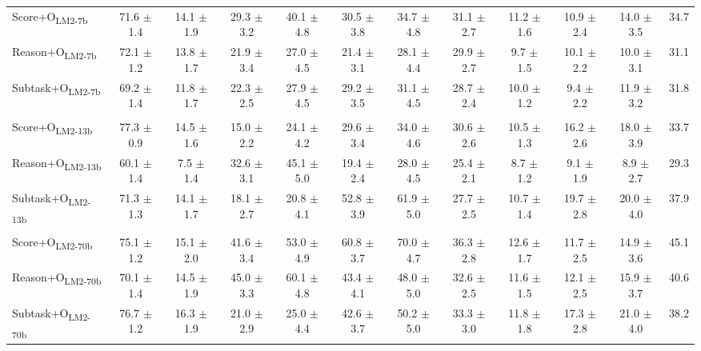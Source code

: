 \documentclass[11pt]{article}
\begin{document}
\begin{table}
\begin{tabular}{l cc | cc | cc | cc | cc | C{1cm}}
\\ 
Score+O\textsubscript{\scriptsize{LM2-7b}}    &  71.6 $\pm$ 1.4  &  14.1 $\pm$ 1.9  &  29.3 $\pm$ 3.2  &  40.1 $\pm$ 4.8  &  30.5 $\pm$ 3.8  &  34.7 $\pm$ 4.8  &  31.1 $\pm$ 2.7  &  11.2 $\pm$ 1.6  &  10.9 $\pm$ 2.4  &  14.0 $\pm$ 3.5  &  34.7 \\ 
Reason+O\textsubscript{\scriptsize{LM2-7b}}    &  72.1 $\pm$ 1.2  &  13.8 $\pm$ 1.7  &  21.9 $\pm$ 3.4  &  27.0 $\pm$ 4.5  &  21.4 $\pm$ 3.1  &  28.1 $\pm$ 4.4  &  29.9 $\pm$ 2.7  &  9.7 $\pm$ 1.5  &  10.1 $\pm$ 2.2  &  10.0 $\pm$ 3.1  &  31.1 \\ 
Subtask+O\textsubscript{\scriptsize{LM2-7b}}    &  69.2 $\pm$ 1.4  &  11.8 $\pm$ 1.7  &  22.3 $\pm$ 2.5  &  27.9 $\pm$ 4.5  &  29.2 $\pm$ 3.5  &  31.1 $\pm$ 4.5  &  28.7 $\pm$ 2.4  &  10.0 $\pm$ 1.2  &  9.4 $\pm$ 2.2  &  11.9 $\pm$ 3.2  &  31.8 \\ 
\\ 
Score+O\textsubscript{\scriptsize{LM2-13b}}    &  77.3 $\pm$ 0.9  &  14.5 $\pm$ 1.6  &  15.0 $\pm$ 2.2  &  24.1 $\pm$ 4.2  &  29.6 $\pm$ 3.4  &  34.0 $\pm$ 4.6  &  30.6 $\pm$ 2.6  &  10.5 $\pm$ 1.3  &  16.2 $\pm$ 2.6  &  18.0 $\pm$ 3.9  &  33.7 \\ 
Reason+O\textsubscript{\scriptsize{LM2-13b}}    &  60.1 $\pm$ 1.4  &  7.5 $\pm$ 1.4  &  32.6 $\pm$ 3.1  &  45.1 $\pm$ 5.0  &  19.4 $\pm$ 2.4  &  28.0 $\pm$ 4.5  &  25.4 $\pm$ 2.1  &  8.7 $\pm$ 1.2  &  9.1 $\pm$ 1.9  &  8.9 $\pm$ 2.7  &  29.3 \\ 
Subtask+O\textsubscript{\scriptsize{LM2-13b}}    &  71.3 $\pm$ 1.3  &  14.1 $\pm$ 1.7  &  18.1 $\pm$ 2.7  &  20.8 $\pm$ 4.1  &  52.8 $\pm$ 3.9  &  61.9 $\pm$ 5.0  &  27.7 $\pm$ 2.5  &  10.7 $\pm$ 1.4  &  19.7 $\pm$ 2.8  &  20.0 $\pm$ 4.0  &  37.9 \\ 
\\ 
Score+O\textsubscript{\scriptsize{LM2-70b}}    &  75.1 $\pm$ 1.2  &  15.1 $\pm$ 2.0  &  41.6 $\pm$ 3.4  &  53.0 $\pm$ 4.9  &  60.8 $\pm$ 3.7  &  70.0 $\pm$ 4.7  &  36.3 $\pm$ 2.8  &  12.6 $\pm$ 1.7  &  11.7 $\pm$ 2.5  &  14.9 $\pm$ 3.6  &  45.1 \\ 
Reason+O\textsubscript{\scriptsize{LM2-70b}}    &  70.1 $\pm$ 1.4  &  14.5 $\pm$ 1.9  &  45.0 $\pm$ 3.3  &  60.1 $\pm$ 4.8  &  43.4 $\pm$ 4.1  &  48.0 $\pm$ 5.0  &  32.6 $\pm$ 2.5  &  11.6 $\pm$ 1.5  &  12.1 $\pm$ 2.5  &  15.9 $\pm$ 3.7  &  40.6 \\ 
Subtask+O\textsubscript{\scriptsize{LM2-70b}}    &  76.7 $\pm$ 1.2  &  16.3 $\pm$ 1.9  &  21.0 $\pm$ 2.9  &  25.0 $\pm$ 4.4  &  42.6 $\pm$ 3.7  &  50.2 $\pm$ 5.0  &  33.3 $\pm$ 3.0  &  11.8 $\pm$ 1.8  &  17.3 $\pm$ 2.8  &  21.0 $\pm$ 4.0  &  38.2 \\ 

\end{tabular}
\end{table}
\end{document}
